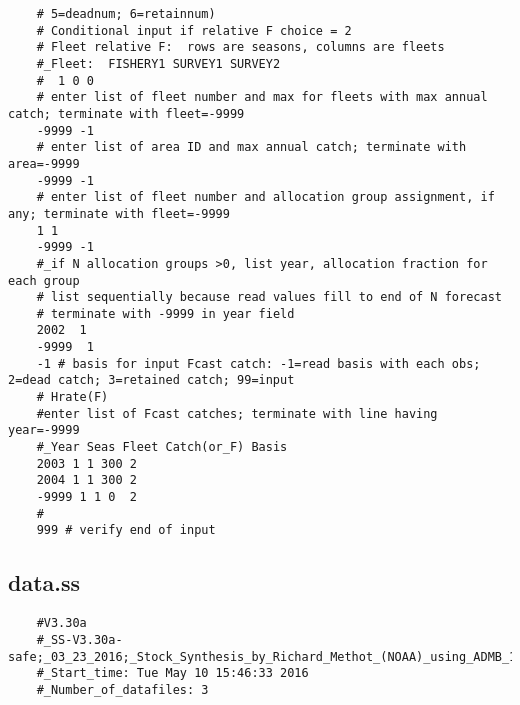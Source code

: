 \begin{landscape}
{\begin{verbatim}
	# 5=deadnum; 6=retainnum)
	# Conditional input if relative F choice = 2
	# Fleet relative F:  rows are seasons, columns are fleets
	#_Fleet:  FISHERY1 SURVEY1 SURVEY2
	#  1 0 0
	# enter list of fleet number and max for fleets with max annual catch; terminate with fleet=-9999
	-9999 -1
	# enter list of area ID and max annual catch; terminate with area=-9999
	-9999 -1
	# enter list of fleet number and allocation group assignment, if any; terminate with fleet=-9999
	1 1
	-9999 -1
	#_if N allocation groups >0, list year, allocation fraction for each group 
	# list sequentially because read values fill to end of N forecast
	# terminate with -9999 in year field 
	2002  1
	-9999  1 
	-1 # basis for input Fcast catch: -1=read basis with each obs; 2=dead catch; 3=retained catch; 99=input
	# Hrate(F)
	#enter list of Fcast catches; terminate with line having year=-9999
	#_Year Seas Fleet Catch(or_F) Basis 
	2003 1 1 300 2
	2004 1 1 300 2
	-9999 1 1 0  2 
	#
	999 # verify end of input 
\end{verbatim}
}



\subsection{data.ss}
\scriptsize{
\begin{verbatim}
	#V3.30a
	#_SS-V3.30a-safe;_03_23_2016;_Stock_Synthesis_by_Richard_Methot_(NOAA)_using_ADMB_11.1
	#_Start_time: Tue May 10 15:46:33 2016
	#_Number_of_datafiles: 3
	

\end{verbatim}}
\end{landscape}
